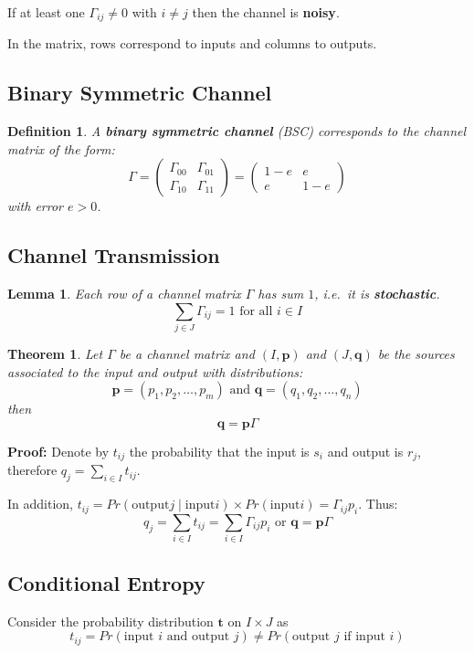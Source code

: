 \documentclass[11pt]{article}
\newtheorem{defn}{Definition}
\newtheorem{theo}{Theorem}
\newtheorem{lem}{Lemma}
\begin{document}
If at least one $\Gamma_{ij} \neq 0$ with $i \neq j$ then the channel is \textbf{noisy}.

In the matrix, rows correspond to inputs and columns to outputs.

\subsection{Binary Symmetric Channel}
\begin{defn}
  A \textbf{binary symmetric channel} (BSC) corresponds to the channel matrix of the form:
  \[
    \Gamma =
    \begin{pmatrix}
      \Gamma_{00} & \Gamma_{01} \\
      \Gamma_{10} & \Gamma_{11}
    \end{pmatrix}
    =
    \begin{pmatrix}
      1 - e & e \\
      e & 1- e
    \end{pmatrix}
  \]
  with error $e > 0$.
\end{defn}

\subsection{Channel Transmission}
\begin{lem}
  Each row of a channel matrix $\Gamma$ has sum $1$, i.e.\ it is \textbf{stochastic}.
  \[
    \sum_{j \in J} \Gamma_{ij} = 1 \text{ for all } i \in I
  \]
\end{lem}

\begin{theo}
  Let $\Gamma$ be a channel matrix and $(I, \textbf{p})$ and $(J, \textbf{q})$ be the sources associated to the input and output with distributions:
  \[
    \textbf{p} = (p_1, p_2, \ldots, p_m) \text{ and } \textbf{q} = (q_1, q_2, \ldots, q_n)
  \]
  then
  \[
    \textbf{q} = \textbf{p} \Gamma
  \]
\end{theo}

\textbf{Proof:}
Denote by $t_{ij}$ the probability that the input is $s_i$ and output is $r_j$, therefore $q_j = \sum_{i \in I} t_{ij}$.

In addition, $t_{ij} = Pr(\text{output} j \mid \text{input} i) \times Pr(\text{input} i) = \Gamma_{ij}p_i$.
Thus:
\[
  q_j = \sum_{i \in I} t_{ij} = \sum_{i \in I} \Gamma_{ij} p_i \text{ or } \textbf{q} = \textbf{p}\Gamma
\]

\subsection{Conditional Entropy}
Consider the probability distribution $\textbf{t}$ on $I \times J$ as
\[
  t_{ij} = Pr(\text{input $i$ and output $j$}) \neq Pr(\text{output $j$ if input $i$})
\]
\end{document}

